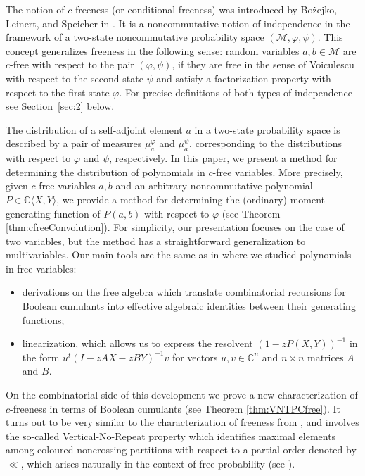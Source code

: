 \documentclass[12pt]{amsart}
\def\C{{\mathbb C}}
\newcommand\IC{{\mathbb C}}
\newcommand{\alg}[1]{\mathcal{#1}}
\theoremstyle{definition}
\numberwithin{equation}{section}
\begin{document}
The notion of \(c\)-freeness (or conditional freeness) was introduced by
Bo\.{z}ejko, Leinert, and Speicher in
\cite{BozejkoSpeicher:psi:1991,BozejkoLeinertSpeicher:1996:convolution}.
It is a noncommutative notion of independence in the framework
of a two-state noncommutative probability space \((\alg{M}, \varphi, \psi)\).
This concept generalizes freeness in the following sense:
random variables \(a,b \in \alg{M}\) are
\(c\)-free with respect to the pair \((\varphi,\psi)\), if they are free in the sense of
Voiculescu with respect to the second state \(\psi\) and satisfy
a factorization property with respect to the first state $\varphi$.
For precise definitions of both types of independence see Section~\ref{sec:2} below.

The distribution of a self-adjoint element \(a\) in a two-state probability
space is described by a pair of measures \(\mu_a^{\varphi}\) and
\(\mu_a^{\psi}\), corresponding to the distributions with respect to
\(\varphi\) and \(\psi\), respectively. In this paper, we present a method for
determining the distribution of polynomials in \(c\)-free variables.
More precisely,
given  \(c\)-free variables \(a,b\) and an arbitrary noncommutative polynomial \(P
\in \C\langle X,Y\rangle\), we provide a method for determining the (ordinary) moment
generating function of \(P(a,b)\) with respect to \(\varphi\)
(see Theorem
\ref{thm:cfreeConvolution}). For simplicity, our presentation focuses on the
case of two variables, but the method has a straightforward generalization to
multivariables. Our main tools are the same as in
\cite{LehnerSzpojankowski:2023:freeint1}
where we studied polynomials in free variables:
\begin{itemize}
 \item
  derivations on the free algebra which translate combinatorial
  recursions for Boolean cumulants into effective algebraic identities
  between their generating functions;
 \item
  linearization, which allows us to express the resolvent
  $(1-zP(X,Y))^{-1}$ in the form $u^t (I-zAX-zBY)^{-1}v$ for vectors
  $u,v\in \IC^n$ and $n\times n$ matrices $A$ and $B$.
\end{itemize}
On the combinatorial side of this development we prove a new characterization
of $c$-freeness in terms of Boolean cumulants (see Theorem
\ref{thm:VNTPCfree}). It turns out to be very similar to the characterization
of freeness from \cite{FMNS2}, and involves the so-called Vertical-No-Repeat
property which identifies maximal elements among coloured noncrossing
partitions with respect to a partial order denoted by $\ll$, which arises
naturally in the context of free probability (see
\cite{BelinschiNicaBBPforKTuples}). 
\end{document}
